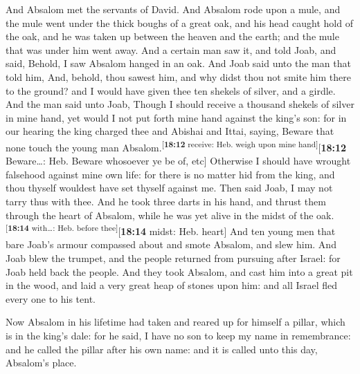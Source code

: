  And Absalom met the servants of David. And Absalom rode
upon a mule, and the mule went under the thick boughs of a great oak,
and his head caught hold of the oak, and he was taken up between the
heaven and the earth; and the mule that was under him went away.
 And a certain man saw it, and told Joab, and said,
Behold, I saw Absalom hanged in an oak.  And Joab said
unto the man that told him, And, behold, thou sawest him, and why didst
thou not smite him there to the ground? and I would have given thee ten
shekels of silver, and a girdle.  And the man said unto
Joab, Though I should receive a thousand shekels of silver in mine hand,
yet would I not put forth mine hand against the king's son: for in our
hearing the king charged thee and Abishai and Ittai, saying, Beware that
none touch the young man Absalom.\textsuperscript{{[}\textbf{18:12}
receive: Heb. weigh upon mine hand{]}}{[}\textbf{18:12} Beware\ldots:
Heb. Beware whosoever ye be of, etc{]}  Otherwise I
should have wrought falsehood against mine own life: for there is no
matter hid from the king, and thou thyself wouldest have set thyself
against me.  Then said Joab, I may not tarry thus with
thee. And he took three darts in his hand, and thrust them through the
heart of Absalom, while he was yet alive in the midst of the
oak.\textsuperscript{{[}\textbf{18:14} with\ldots: Heb. before
thee{]}}{[}\textbf{18:14} midst: Heb. heart{]}  And ten
young men that bare Joab's armour compassed about and smote Absalom, and
slew him.  And Joab blew the trumpet, and the people
returned from pursuing after Israel: for Joab held back the people.
 And they took Absalom, and cast him into a great pit in
the wood, and laid a very great heap of stones upon him: and all Israel
fled every one to his tent.

 Now Absalom in his lifetime had taken and reared up for
himself a pillar, which is in the king's dale: for he said, I have no
son to keep my name in remembrance: and he called the pillar after his
own name: and it is called unto this day, Absalom's place.

